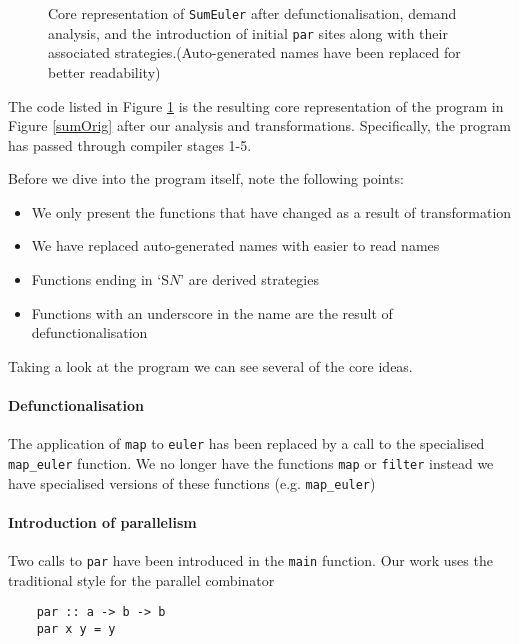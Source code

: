 \begin{figure}[t!]
  
\caption{Core representation of \texttt{SumEuler} after defunctionalisation, demand
         analysis, and the introduction of initial \texttt{par} sites along
         with their associated strategies.(Auto-generated names have been
         replaced for better readability)}
\label{sumLast}
\end{figure}

The code listed in Figure \ref{sumLast} is the resulting core representation
of the program in Figure \ref{sumOrig} after our analysis and transformations.
Specifically, the program has passed through compiler stages 1-5.

Before we dive into the program itself, note the following points:

\begin{itemize}
    \item We only present the functions that have changed as a result of transformation
    \item We have replaced auto-generated names with easier to read names
    \item Functions ending in `S$N$' are derived strategies
    \item Functions with an underscore in the name are the result of defunctionalisation
\end{itemize}

Taking a look at the program we can see several of the core ideas.

\paragraph{Defunctionalisation}
The application of \verb-map- to \verb-euler- has been replaced by a call to
the specialised \verb-map_euler- function.  We no longer have the functions
\verb-map- or \verb-filter- instead we have specialised versions of these
functions (e.g. \verb-map_euler-)

\paragraph{Introduction of parallelism}
Two calls to \verb-par- have been introduced in the \texttt{main} function. Our
work uses the traditional style for the parallel combinator \citep{strategies}

\begin{verbatim}
    par :: a -> b -> b
    par x y = y
\end{verbatim}

